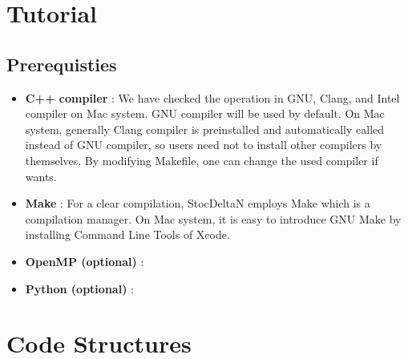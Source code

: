 \documentclass[aps, prd
, preprint
, nofootinbib 
, notitlepage
, longbibliography
]{revtex4-1}
\begin{document}
\section{Tutorial}

\subsection{Prerequisties}

\begin{itemize}
\item {\sffamily\bfseries C++ compiler} : We have checked the operation in GNU, Clang, and Intel compiler on Mac system. GNU compiler will be used by default.
On Mac system, generally Clang compiler is preinstalled and automatically called instead of GNU compiler, so users need not to install other compilers by themselves. 
By modifying Makefile, one can change the used compiler if wants.

\item {\sffamily\bfseries Make} : For a clear compilation, StocDeltaN employs Make which is a compilation manager. On Mac system, it is easy to introduce GNU Make
by installing Command Line Tools of Xcode.

\item {\sffamily\bfseries OpenMP (optional)} : 

\item{\sffamily\bfseries Python (optional)} : 
\end{itemize}




\section{Code Structures}

















\end{document}
